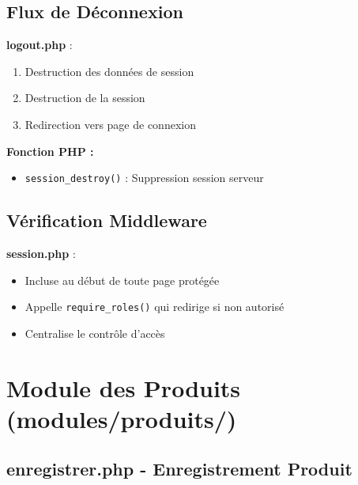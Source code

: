 \documentclass[12pt,a4paper]{report}
\begin{document}
\subsection{Flux de Déconnexion}

\textbf{logout.php} :
\begin{enumerate}
    \item Destruction des données de session
    \item Destruction de la session
    \item Redirection vers page de connexion
\end{enumerate}

\textbf{Fonction PHP :}
\begin{itemize}
    \item \texttt{session\_destroy()} : Suppression session serveur
\end{itemize}

\subsection{Vérification Middleware}

\textbf{session.php} :
\begin{itemize}
    \item Incluse au début de toute page protégée
    \item Appelle \texttt{require\_roles()} qui redirige si non autorisé
    \item Centralise le contrôle d'accès
\end{itemize}

\section{Module des Produits (modules/produits/)}

\subsection{enregistrer.php - Enregistrement Produit}
\end{document}
